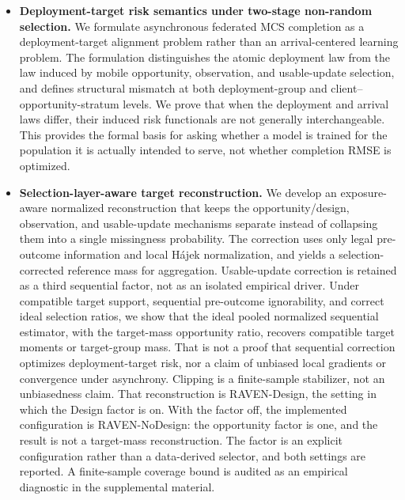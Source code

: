 \documentclass[letterpaper,journal]{IEEEtran}
\begin{document}
\begin{itemize}
    \item \textbf{Deployment-target risk semantics under two-stage non-random
    selection.}
    We formulate asynchronous federated MCS completion as a
    deployment-target alignment problem rather than an arrival-centered
    learning problem.  The formulation distinguishes the atomic deployment law
    from the law induced by mobile opportunity, observation, and usable-update
    selection, and defines structural mismatch at both deployment-group and
    client--opportunity-stratum levels.  We prove that when the deployment and
    arrival laws differ, their induced risk functionals are not generally
    interchangeable.  This provides the formal basis for asking whether a model
    is trained for the population it is actually intended to serve, not whether
    completion RMSE is optimized.

    \item \textbf{Selection-layer-aware target reconstruction.}
    We develop an exposure-aware normalized reconstruction that keeps the
    opportunity/design, observation, and usable-update mechanisms separate
    instead of collapsing them into a single missingness probability.  The
    correction uses only legal pre-outcome information and local
    H\'ajek normalization, and yields a selection-corrected reference mass
    for aggregation.  Usable-update correction is retained as a third
    sequential factor, not as an isolated empirical driver.
    Under compatible target support, sequential pre-outcome ignorability,
    and correct ideal selection ratios, we show that the ideal pooled
    normalized sequential estimator,
    with the target-mass opportunity ratio, recovers compatible target moments
    or target-group mass.  That is not a
    proof that sequential correction optimizes deployment-target risk, nor a
    claim of unbiased local gradients or convergence under asynchrony.
    Clipping is a finite-sample
    stabilizer, not an unbiasedness claim.  That reconstruction is
    RAVEN-Design, the setting in which the Design factor is on.  With the
    factor off, the implemented configuration is RAVEN-NoDesign: the
    opportunity factor is one, and the result is not a target-mass
    reconstruction.  The factor is an explicit configuration rather than a
    data-derived selector, and both settings are reported.  A finite-sample
    coverage bound is audited as an empirical diagnostic in the
    supplemental material.


\end{itemize}
\end{document}

